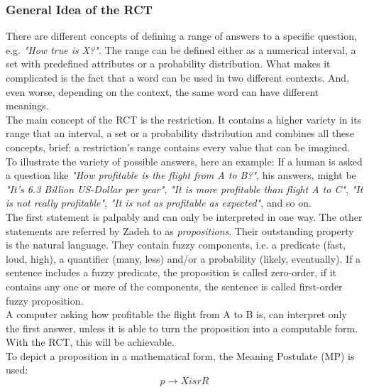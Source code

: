 \documentclass[conference]{IEEEtran}
\begin{document}
\subsubsection{General Idea of the RCT}
There are different concepts of defining a range of answers to a specific question, e.g. \emph{"How true is X?"}. The range can be defined either as a numerical interval, a set with predefined attributes or a probability distribution. What makes it complicated is the fact that a word can be used in two different contexts. And, even worse, depending on the context, the same word can have different meanings.\\
The main concept of the RCT is the restriction. It contains a higher variety in its range that an interval, a set or a probability distribution and combines all these concepts, brief: a restriction's range contains every value that can be imagined. To illustrate the variety of possible answers, here an example: If a human is asked a question like \emph{"How profitable is the flight from A to B?"}, his answers, might be \emph{"It's 6.3 Billion US-Dollar per year"}, \emph{"It is more profitable than flight A to C"}, \emph{"It is not really profitable"}, \emph{"It is not as profitable as expected"}, and so on.\\
The first statement is palpably and can only be interpreted in one way. The other statements are referred by Zadeh \cite{zadeh2013} to as \emph{propositions}. Their outstanding property is the natural language. They contain fuzzy components, i.e. a predicate (fast, loud, high), a quantifier (many, less) and/or a probability (likely, eventually). If a sentence includes a fuzzy predicate, the proposition is called zero-order, if it contains any one or more of the components, the sentence is called first-order fuzzy proposition.\\ 
A computer asking how profitable the flight from A to B is, can interpret only the first answer, unless it is able to turn the proposition into a computable form. With the RCT, this will be achievable.\\
To depict a proposition in a mathematical form, the Meaning Postulate (MP) is used:
\begin{equation} \label{eq:mp}
p \rightarrow X isr R
\end{equation}
\end{document}
